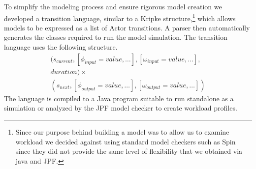 To simplify the modeling process and ensure rigorous model creation we
developed a transition language, similar to a Kripke structure,\footnote{Since our purpose behind building a model was to allow us to examine workload we decided against using standard model checkers such as Spin since they did not provide the same level of flexibility that we obtained via java and JPF.}  which allows
models to be expressed as a list of Actor transitions.  A parser then
automatically generates the classes required to run the model simulation.
The transition language uses the following structure.
\begin{equation}
\begin{split}
(s_{current}, [\phi_{input} = value,\ldots], [\omega_{input} = value,\ldots],\\
duration) \times \\
(s_{next}, [\phi_{output} =
value,\ldots], [\omega_{output} = value,\ldots])
\end{split}
\end{equation}
\noindent The language is compiled to a Java program suitable to run standalone
as a simulation or analyzed by the JPF model checker to create
workload profiles.
